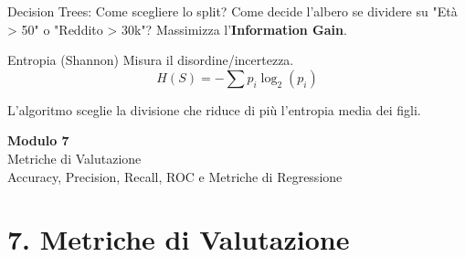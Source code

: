 \documentclass[aspectratio=169, 10pt]{beamer}
\begin{document}
\begin{frame}{Decision Trees: Come scegliere lo split?}
    Come decide l'albero se dividere su "Età > 50" o "Reddito > 30k"?
    Massimizza l'\textbf{Information Gain}.
    
    \begin{block}{Entropia (Shannon)}
        Misura il disordine/incertezza.
        \[ H(S) = - \sum p_i \log_2(p_i) \]
    \end{block}
    
    \centering
    
    \small L'algoritmo sceglie la divisione che riduce di più l'entropia media dei figli.
\end{frame}


\begin{frame}[plain]
    \centering
    \vspace{2cm}
    {\Huge \textbf{Modulo 7}}\\[0.5cm]
    {\Huge \textcolor{Accent}{Metriche di Valutazione}}\\[1cm]
    {\large Accuracy, Precision, Recall, ROC e Metriche di Regressione}
\end{frame}

\section{7. Metriche di Valutazione}
\end{document}
